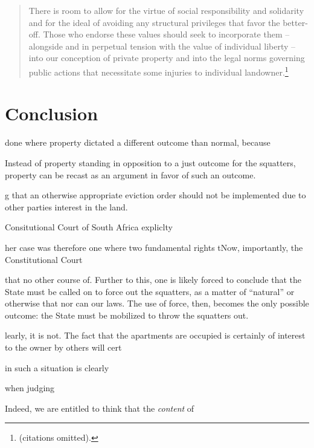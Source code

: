 \begin{quote}
There is room to allow for the virtue of social responsibility and solidarity and for the ideal of avoiding any structural privileges that favor the better-off. Those who endorse these values should seek to
incorporate them -- alongside and in perpetual tension with the value of
individual liberty -- into our conception of private property and into the legal norms governing
public actions that necessitate some injuries to individual landowner.\footnote{\cite[802]{dagan99} (citations omitted).}
\end{quote}

\section{Conclusion}


done where property dictated a different outcome than normal, because 

Instead of property standing in opposition to a just outcome for the squatters, property can be recast as an argument in favor of such an outcome.





g that an otherwise appropriate eviction order should not be implemented due to other parties interest in the land. 


Consitutional Court of South Africa expliclty


her case was therefore one where two fundamental rights tNow, importantly, the Constitutional Court 



that no other course of. Further to this, one is likely forced to conclude that the State must be called on to force out the squatters, as a matter of ``natural'' or otherwise  that nor can our laws. The use of force, then, becomes the only possible outcome: the State must be mobilized to throw the squatters out. 





learly, it is not. The fact that the apartments are occupied is certainly of interest to the owner by others will cert

in such a situation is clearly 


when judging 

 Indeed, we are entitled to think that the {\it content} of 

